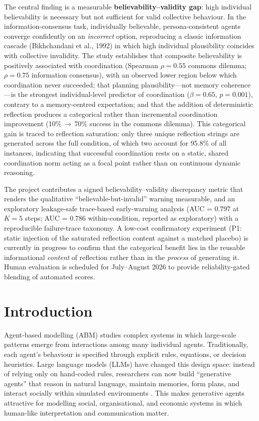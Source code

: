 \documentclass[11pt]{article}
\begin{document}
The central finding is a measurable \textbf{believability--validity gap}: high individual believability is necessary but not sufficient for valid collective behaviour. In the information-consensus task, individually believable, persona-consistent agents converge confidently on an \emph{incorrect} option, reproducing a classic information cascade (Bikhchandani et al., 1992) in which high individual plausibility coincides with collective invalidity. The study establishes that composite believability is positively associated with coordination (Spearman $\rho = 0.55$ commons dilemma; $\rho = 0.75$ information consensus), with an observed lower region below which coordination never succeeded; that planning plausibility---not memory coherence---is the strongest individual-level predictor of coordination ($\beta = 0.65$, $p = 0.001$), contrary to a memory-centred expectation; and that the addition of deterministic reflection produces a categorical rather than incremental coordination improvement (10\%\,$\rightarrow$\,70\% success in the commons dilemma). This categorical gain is traced to reflection saturation: only three unique reflection strings are generated across the full condition, of which two account for 95.8\% of all instances, indicating that successful coordination rests on a static, shared coordination norm acting as a focal point rather than on continuous dynamic reasoning.

The project contributes a signed believability--validity discrepancy metric that renders the qualitative ``believable-but-invalid'' warning measurable, and an exploratory leakage-safe trace-based early-warning analysis (AUC = 0.797 at $K = 5$ steps; AUC = 0.786 within-condition, reported as exploratory) with a reproducible failure-trace taxonomy. A low-cost confirmatory experiment (P1: static injection of the saturated reflection content against a matched placebo) is currently in progress to confirm that the categorical benefit lies in the reusable informational \emph{content} of reflection rather than in the \emph{process} of generating it. Human evaluation is scheduled for July--August 2026 to provide reliability-gated blending of automated scores.

\section{Introduction}
Agent-based modelling (ABM) studies complex systems in which large-scale patterns emerge from interactions among many individual agents. Traditionally, each agent's behaviour is specified through explicit rules, equations, or decision heuristics. Large language models (LLMs) have changed this design space: instead of relying only on hand-coded rules, researchers can now build ``generative agents'' that reason in natural language, maintain memories, form plans, and interact socially within simulated environments \cite{park2023generative, gao2024survey, ghaffarzadegan2024tutorial}. This makes generative agents attractive for modelling social, organisational, and economic systems in which human-like interpretation and communication matter.
\end{document}
